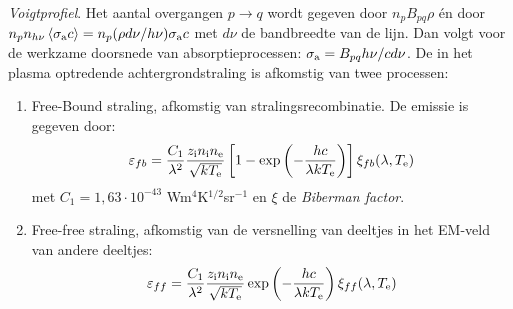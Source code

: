 \documentclass[twoside]{report}
\begin{document}
{\it Voigtprofiel}.
\npar
Het aantal overgangen $p\rightarrow q$ wordt gegeven door $n_pB_{pq}\rho$
\'en door $n_pn_{h\nu}\left\langle \sigma_{\rm a} c \right\rangle=n_p(\rho d\nu/h\nu)\sigma_{\rm a}c$
met $d\nu$ de bandbreedte van de lijn. Dan volgt voor de werkzame doorsnede
van absorptieprocessen: $\sigma_{\rm a}=B_{pq}h\nu/cd\nu$.
\npar
De in het plasma optredende achtergrondstraling is afkomstig van twee processen:
\begin{enumerate}
\item Free-Bound straling, afkomstig van stralingsrecombinatie. De emissie is
      gegeven door:
      \[
      \varepsilon_{fb}=\frac{C_1}{\lambda^2}\frac{z_{\rm i}n_{\rm i}n_{\rm e}}{\sqrt{kT_{\rm e}}}\left[1-\exp\left(-\frac{hc}{\lambda kT_{\rm e}}\right)\right]\xi_{fb}(\lambda,T_{\rm e})
      \]
      met $C_1=1,63\cdot10^{-43}$ Wm$^4$K$^{1/2}$sr$^{-1}$ en $\xi$ de
      {\it Biberman factor}.
\item Free-free straling, afkomstig van de versnelling van deeltjes in het
      EM-veld van andere deeltjes:
      \[
      \varepsilon_{ff}=\frac{C_1}{\lambda^2}\frac{z_{\rm i}n_{\rm i}n_{\rm e}}{\sqrt{kT_{\rm e}}}\exp\left(-\frac{hc}{\lambda kT_{\rm e}}\right)\xi_{ff}(\lambda,T_{\rm e})
      \]
\end{enumerate}
\end{document}
